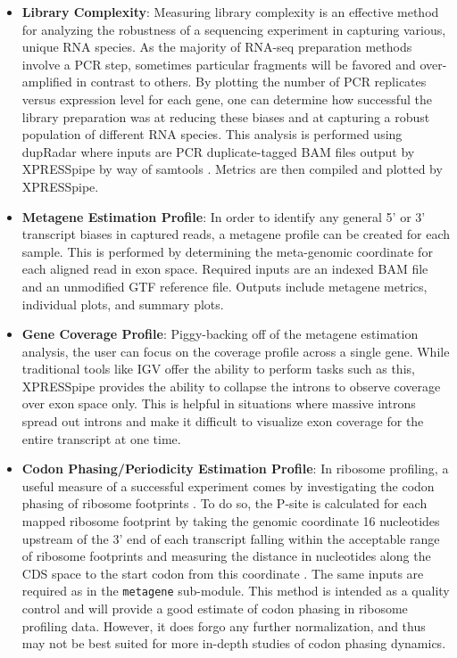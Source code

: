 \documentclass[11pt, a4paper, oneside]{article}
\begin{document}
\begin{enumerate}
\begin{itemize}
      \item \textbf{Library Complexity}: Measuring library complexity is an effective method for analyzing the robustness of a sequencing experiment in capturing various, unique RNA species. As the majority of RNA-seq preparation methods involve a PCR step, sometimes particular fragments will be favored and over-amplified in contrast to others. By plotting the number of PCR replicates versus expression level for each gene, one can determine how successful the library preparation was at reducing these biases and at capturing a robust population of different RNA species. This analysis is performed using dupRadar \cite{dupradar} where inputs are PCR duplicate-tagged BAM files output by XPRESSpipe by way of samtools \cite{samtools}. Metrics are then compiled and plotted by XPRESSpipe.

      \item \textbf{Metagene Estimation Profile}: In order to identify any general 5' or 3' transcript biases in captured reads, a metagene profile can be created for each sample. This is performed by determining the meta-genomic coordinate for each aligned read in exon space. Required inputs are an indexed BAM file and an unmodified GTF reference file. Outputs include metagene metrics, individual plots, and summary plots.

      \item \textbf{Gene Coverage Profile}: Piggy-backing off of the metagene estimation analysis, the user can focus on the coverage profile across a single gene. While traditional tools like IGV \cite{igv} offer the ability to perform tasks such as this, XPRESSpipe provides the ability to collapse the introns to observe coverage over exon space only. This is helpful in situations where massive introns spread out introns and make it difficult to visualize exon coverage for the entire transcript at one time.

      \item \textbf{Codon Phasing/Periodicity Estimation Profile}: In ribosome profiling, a useful measure of a successful experiment comes by investigating the codon phasing of ribosome footprints \cite{ingolia_meth}. To do so, the P-site is calculated for each mapped ribosome footprint by taking the genomic coordinate 16 nucleotides upstream of the 3' end of each transcript falling within the acceptable range of ribosome footprints and measuring the distance in nucleotides along the CDS space to the start codon from this coordinate \cite{ribowaltz}. The same inputs are required as in the \texttt{metagene} sub-module. This method is intended as a quality control and will provide a good estimate of codon phasing in ribosome profiling data. However, it does forgo any further normalization, and thus may not be best suited for more in-depth studies of codon phasing dynamics.


\end{itemize}
\end{enumerate}
\end{document}
